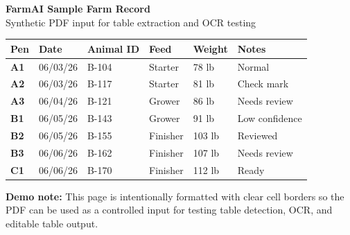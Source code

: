 \documentclass[11pt]{article}
\begin{document}
\begin{center}
{\Large\bfseries FarmAI Sample Farm Record}\\[4pt]
{\normalsize Synthetic PDF input for table extraction and OCR testing}\\[14pt]
\end{center}

\begin{tabular}{|>{\bfseries}p{0.62in}|p{0.9in}|p{1.0in}|p{0.95in}|p{0.82in}|p{1.68in}|}
\hline
Pen & Date & Animal ID & Feed & Weight & Notes \\
\hline
A1 & 06/03/26 & B-104 & Starter & 78 lb & Normal \\
\hline
A2 & 06/03/26 & B-117 & Starter & 81 lb & Check mark \\
\hline
A3 & 06/04/26 & B-121 & Grower & 86 lb & Needs review \\
\hline
B1 & 06/05/26 & B-143 & Grower & 91 lb & Low confidence \\
\hline
B2 & 06/05/26 & B-155 & Finisher & 103 lb & Reviewed \\
\hline
B3 & 06/06/26 & B-162 & Finisher & 107 lb & Needs review \\
\hline
C1 & 06/06/26 & B-170 & Finisher & 112 lb & Ready \\
\hline
\end{tabular}

\vspace{18pt}

\textbf{Demo note:} This page is intentionally formatted with clear cell borders so the PDF can be used as a controlled input for testing table detection, OCR, and editable table output.
\end{document}

